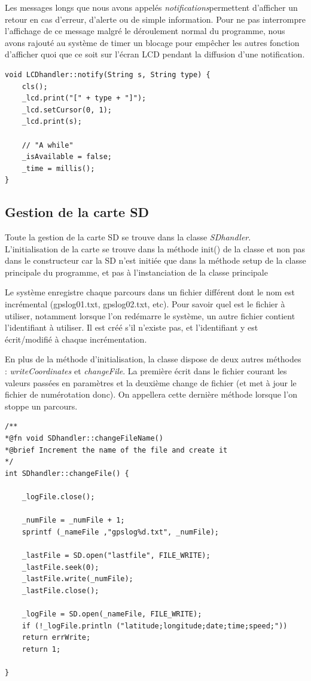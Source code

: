\documentclass[a4paper,12pt,titlepage]{article}
\begin{document}
Les messages longs que nous avons appelés \emph{notifications}permettent
d'afficher un retour en cas d'erreur, d'alerte ou de simple information. Pour
ne pas interrompre l'affichage de ce message malgré le déroulement normal du
programme, nous avons rajouté au système de timer un blocage pour empêcher les
autres fonction d'afficher quoi que ce soit sur l'écran LCD pendant la diffusion
d'une notification.

\begin{lstlisting}[caption={notify}, label={notify}]
void LCDhandler::notify(String s, String type) {
    cls();
    _lcd.print("[" + type + "]");
    _lcd.setCursor(0, 1);
    _lcd.print(s);

    // "A while"
    _isAvailable = false;
    _time = millis();
}

\end{lstlisting}

\subsection{Gestion de la carte SD}

Toute la gestion de la carte SD se trouve dans la classe \emph{SDhandler}.
L'initialisation de la carte se trouve dans la méthode init() de la classe et
non pas dans le constructeur car la SD n'est initiée que dans la méthode setup
de la classe principale du programme, et pas à l'instanciation de la classe
principale

Le système enregistre chaque parcours dans un fichier différent dont le nom est
incrémental (gpslog01.txt, gpslog02.txt, etc).
Pour savoir quel est le fichier à utiliser, notamment lorsque l'on redémarre
le système, un autre fichier contient l'identifiant à utiliser.
Il est créé s'il n'existe pas, et l'identifiant y est écrit/modifié à chaque
incrémentation.

En plus de la méthode d'initialisation, la classe dispose de deux autres
méthodes : \emph{writeCoordinates} et \emph{changeFile}. La première écrit
dans le fichier courant les valeurs passées en paramètres et la deuxième
change de fichier (et met à jour le fichier de numérotation donc).
On appellera cette dernière méthode lorsque l'on stoppe un parcours.

\begin{lstlisting}[caption={changeFile}, label={changeFile}]
/**
*@fn void SDhandler::changeFileName()
*@brief Increment the name of the file and create it
*/
int SDhandler::changeFile() {

    _logFile.close();

    _numFile = _numFile + 1;
    sprintf (_nameFile ,"gpslog%d.txt", _numFile);

    _lastFile = SD.open("lastfile", FILE_WRITE);
    _lastFile.seek(0);
    _lastFile.write(_numFile);
    _lastFile.close();

    _logFile = SD.open(_nameFile, FILE_WRITE);
    if (!_logFile.println ("latitude;longitude;date;time;speed;"))
    return errWrite;
    return 1;

}
\end{lstlisting}
\end{document}

